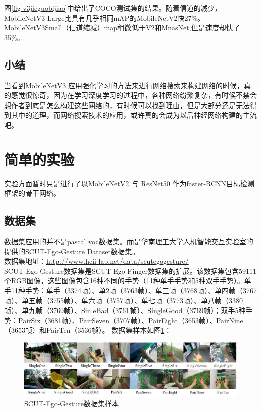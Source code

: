 \documentclass[UTF8,a4paper,12pt]{ctexart}
\begin{document}
图\ref{fig-v3jieguobijiao}中给出了COCO测试集的结果。随着信道的减少，MobileNetV3 Large比具有几乎相同mAP的MobileNetV2快27\%。MobileNetV3Small（信道缩减）map稍微低于V2和MnasNet\cite{MnasNet},但是速度却快了35\%。
\subsection{小结}
当看到MobileNetV3 应用强化学习的方法来进行网络搜索来构建网络的时候，真的感觉很惊奇，因为在学习深度学习的过程中，各种网络纷繁复杂，有时候不禁会想作者到底是怎么构建这些网络的，有时候可以找到理由，但是大部分还是无法得到其中的道理，而网络搜索技术的应用，或许真的会成为以后神经网络构建的主流吧。


\section{简单的实验}
实验方面暂时只是进行了以MobileNetV2 与 ResNet50\cite{resnet} 作为faster-RCNN\cite{23}目标检测框架的骨干网络。
\subsection{数据集}
数据集应用的并不是pascal voc数据集\cite{VOC2007}。而是华南理工大学人机智能交互实验室的提供的SCUT-Ego-Gesture Dataset\cite{YOLSE}数据集。\\
数据集地址：\url{http://www.hcii-lab.net/data/scutegogesture/}\\
SCUT-Ego-Gesture数据集是SCUT-Ego-Finger数据集的扩展。该数据集包含59111个RGB图像，这些图像包含16种不同的手势（11种单手手势和5种双手手势）。单手11种手势：单手（3374帧）、单2帧（3763帧）、单三帧（3768帧）、单四帧（3767帧）、单五帧（3755帧）、单六帧（3757帧）、单七帧（3773帧）、单八帧（3380帧）、单九帧（3769帧）、SinleBad（3761帧）、SingleGood（3769帧）；双手5种手势：PairSix（3681帧）、PairSeven（3707帧）、PairEight（3653帧）、PairNine（3653帧）和PairTen（3536帧）。
数据集样本如图\ref{fig-SCUT}：
\begin{figure}[htbp]
	\centering
	\includegraphics[width=\linewidth]{webmin/SCUT.jpg}
		
		\caption{SCUT-Ego-Gesture数据集样本}
		\label{fig-SCUT}
\end{figure}
\end{document}
